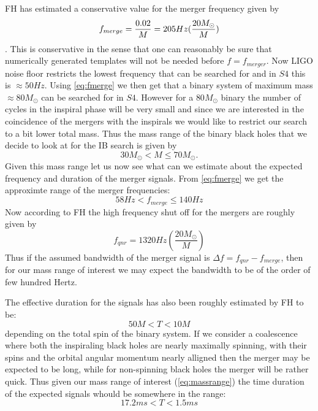 \documentclass[10pt]{article}
\begin{document}
FH has estimated a conservative value for the merger frequency given
by 
\begin{equation}
f_{merge} = \frac{0.02}{M} \\
          = 205 Hz (\frac{20M_{\odot}}{M})
\label{eq:fmerge}
\end{equation}.
This is conservative in the sense that one can reasonably be sure that
numerically generated templates will not be needed before $f = f_{merger}$.
Now LIGO noise floor restricts the lowest frequency that can be searched 
for and in $S4$ this is $\approx 50 Hz$. Using \eqref{eq:fmerge} we 
then get that a binary system of maximum mass $\approx 80M_{\odot}$ 
can be searched for in $S4$.  However for a $80 M_{\odot}$ binary the 
number of cycles in the inspiral phase will be very small and since we
are interested in the coincidence of the mergers with the inspirals we
would like to restrict our search to a bit lower total mass.  Thus the 
mass range of the binary black holes that we decide to look at for the 
IB search is given by 
\begin{equation}
30 M_{\odot} < M \leq 70 M_{\odot}. 
\label{eq:massrange}
\end{equation}
Given this mass range let us now see what can we estimate about the 
expected frequency and duration of the merger signals. From 
\eqref{eq:fmerge} we get the approximte range of the merger frequencies:
\begin{equation}
58 Hz < f_{merge} \leq 140 Hz
\label{eq:frange}
\end{equation}
Now according to FH the high frequency shut off for the mergers are
roughly given by 
\begin{equation}
f_{qnr} = 1320 Hz (\frac{20M_{\odot}}{M})
\label{eq:fqnr}
\end{equation}
Thus if the assumed bandwidth of the merger signal is 
$\Delta f = f_{qnr} - f_{merge}$,  then for our mass range of 
interest we may expect the bandwidth to be of the order of few
hundred Hertz.  

The effective duration for the signals has also been roughly estimated
by FH to be:
\begin{equation}
50 M < T < 10 M
\label{eq:timerange}
\end{equation}
depending on the total spin of the binary system. If we consider
a coalescence where both the inspiraling black holes are nearly
maximally spinning, with their spins and the orbital angular momentum
nearly alligned then the merger may be expected to be long,  while
for non-spinning black holes the merger will be rather quick.  Thus 
given our mass range of interest (\eqref{eq:massrange}) the 
time duration of the expected signals whould be somewhere in the 
range:
\begin{equation}
17.2 ms < T < 1.5 ms
\label{eq:trange}
\end{equation} 
  
\end{document}
